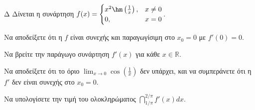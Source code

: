 \begin{thema}{Δ}
Δίνεται η συνάρτηση $\displaystyle f(x) = \begin{cases} x^2 \hm\left(\frac{1}{x}\right), & x \ne 0 \\ 0, & x = 0 \end{cases}$.
\begin{erwthma}
    \item Να αποδείξετε ότι η $f$ είναι συνεχής και παραγωγίσιμη στο $x_0 = 0$ με $f'(0) = 0$.
    \item Να βρείτε την παράγωγο συνάρτηση $f'(x)$ για κάθε $x \in \mathbb{R}$.
    \item Να αποδείξετε ότι το όριο $\displaystyle \lim_{x\to 0} \cos\left(\frac{1}{x}\right)$ δεν υπάρχει, και να συμπεράνετε ότι η $f'$ δεν είναι συνεχής στο $x_0 = 0$.
    \item Να υπολογίσετε την τιμή του ολοκληρώματος $\displaystyle \dint_{1/\pi}^{2/\pi} f'(x) dx$.
\end{erwthma}
\end{thema}
